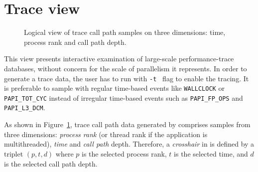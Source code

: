 


\newcommand{\crosshair}{crosshair}
\newcommand{\traceview}{Trace view}
\newcommand{\depthview}{Depth view}
\newcommand{\summaryview}{Summary view}
\newcommand{\miniview}{Mini map view}
\newcommand{\callview}{Call path view}



\section{Trace view}

\begin{figure}[t]
\caption{Logical view of trace call path samples on three dimensions: time, process rank and call path depth.}
\label{fig:hpctraceviewer-callpath}
\end{figure}

This view presents interactive examination of large-scale performance-trace databases, 
without concern for the scale of parallelism it represents.
In order to generate a trace data, the user has to run \hpcrun{} with {\tt -t } flag to enable the tracing. 
It is preferable to sample with regular time-based events like {\tt WALLCLOCK} or {\tt PAPI\_TOT\_CYC} instead of irregular time-based events such as {\tt PAPI\_FP\_OPS} and {\tt PAPI\_L3\_DCM}.

As shown in Figure~\ref{fig:hpctraceviewer-callpath}, trace call path data generated by \hpcprof{} comprises samples from three dimensions: \emph{process rank} (or thread rank if the application is multithreaded), \emph{time} and \emph{call path} depth.
Therefore, a \emph{\crosshair} in \hpctraceviewer{} is defined by a triplet $(p,t,d)$ where $p$ is the selected process rank, $t$ is the selected time, and $d$ is the selected call path depth. 

